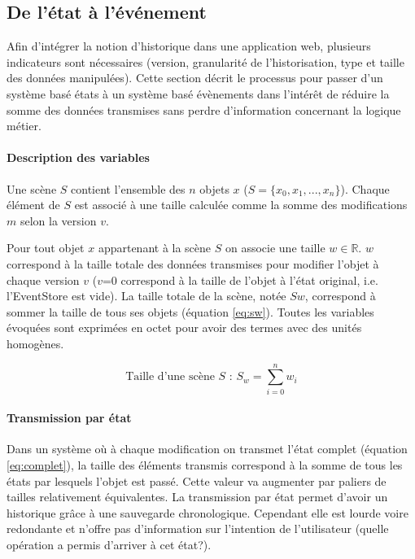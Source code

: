 \subsection{De l'état à l'événement}
\label{sec:statetoevent}
Afin d'intégrer la notion d'historique dans une application web, plusieurs indicateurs 
sont nécessaires (version, granularité de l'historisation, type et taille des données 
manipulées). Cette section décrit le processus pour passer d'un système basé 
états à un système basé évènements dans l'intérêt de réduire la somme des 
données transmises sans perdre d'information concernant la logique métier.
\paragraph{Description des variables}
Une scène $S$ contient l'ensemble des $n$ objets $x$ ($S =\{x_0,x_1,...,x_n\}$). 
Chaque élément de $S$ est associé à une taille calculée comme la somme des 
modifications $m$ selon la version $v$. 

Pour tout objet $x$ appartenant à la scène $S$ on associe une taille $w \in 
\mathbb{R}$. $w$ correspond à la taille totale des données transmises pour 
modifier l'objet à chaque version $v$ ($v$=0 correspond à la taille de l'objet à l'état 
original, i.e. l'\gls{EventStore} est vide). La taille totale de la scène, notée $Sw$, 
correspond à sommer la taille de tous ses objets (équation \ref{eq:sw}). Toutes les 
variables évoquées sont exprimées en octet pour avoir des termes avec des 
unités homogènes.

\begin{equation}
\label{eq:sw}
\text{Taille d'une scène $S$ : } S_w= \sum_{i=0}^{n}w_i
\end{equation}


\paragraph{Transmission par état}
Dans un système où à chaque modification on transmet l'état complet (équation 
\ref{eq:complet}), la taille des éléments transmis correspond à la somme de tous 
les états par lesquels l'objet est passé. Cette valeur va augmenter par paliers de 
tailles relativement équivalentes.
La transmission par état permet d'avoir un historique grâce à une sauvegarde 
chronologique. Cependant elle est lourde voire redondante et n'offre pas 
d'information sur l'intention de l'utilisateur (quelle opération a permis d'arriver à cet 
état?).

